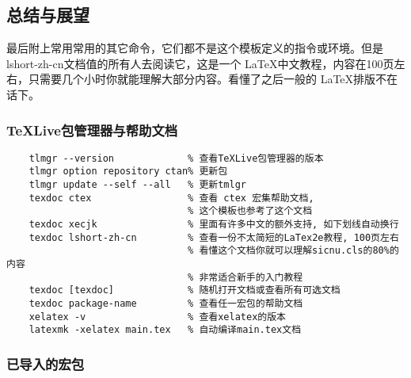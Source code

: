 % 

\subsection{总结与展望}
最后附上常用常用的其它命令，它们都不是这个模板定义的指令或环境。但是lshort-zh-cn文档值的所有人去阅读它，这是一个 \LaTeX 中文教程，内容在100页左右，只需要几个小时你就能理解大部分内容。看懂了之后一般的 \LaTeX 排版不在话下。

\subsubsection{TeXLive包管理器与帮助文档}
\begin{tcolorbox}[colback=gray!10,
    colframe=black,
    width=16cm,
    arc=1mm, auto outer arc,
    boxrule=0.5pt,]
\begin{verbatim}
    tlmgr --version             % 查看TeXLive包管理器的版本
    tlmgr option repository ctan% 更新包
    tlmgr update --self --all   % 更新tmlgr
    texdoc ctex                 % 查看 ctex 宏集帮助文档, 
                                % 这个模板也参考了这个文档
    texdoc xecjk                % 里面有许多中文的额外支持, 如下划线自动换行
    texdoc lshort-zh-cn         % 查看一份不太简短的LaTex2e教程, 100页左右
                                % 看懂这个文档你就可以理解sicnu.cls的80%的内容
                                % 非常适合新手的入门教程
    texdoc [texdoc]             % 随机打开文档或查看所有可选文档
    texdoc package-name         % 查看任一宏包的帮助文档
    xelatex -v                  % 查看xelatex的版本
    latexmk -xelatex main.tex   % 自动编译main.tex文档
\end{verbatim}

\end{tcolorbox}

\subsubsection{已导入的宏包}

